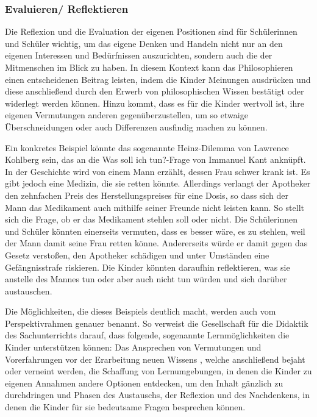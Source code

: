 \subsubsection{Evaluieren/ Reflektieren}


Die Reflexion und die Evaluation der eigenen Positionen sind für Schülerinnen und Schüler wichtig, um das eigene Denken und Handeln nicht nur an den eigenen Interessen und Bedürfnissen auszurichten, sondern auch die der Mitmenschen im Blick zu haben. 
In diesem Kontext kann das Philosophieren einen entscheidenen Beitrag leisten, indem die Kinder Meinungen ausdrücken und diese anschließend durch den Erwerb von philosophischen Wissen bestätigt oder widerlegt werden können. 
Hinzu kommt, dass es für die Kinder wertvoll ist, ihre eigenen Vermutungen anderen gegenüberzustellen, um so etwaige Überschneidungen oder auch Differenzen ausfindig machen zu können. 

Ein konkretes Beispiel könnte das sogenannte \glqq Heinz-Dilemma\grqq{} von Lawrence Kohlberg sein, das an die \glqq Was soll ich tun?\grqq{}-Frage von Immanuel Kant anknüpft. 
In der Geschichte wird von einem Mann erzählt, dessen Frau schwer krank ist. 
Es gibt jedoch eine Medizin, die sie retten könnte.
 Allerdings verlangt der Apotheker den zehnfachen Preis des Herstellungspreises für eine Dosis, so dass sich der Mann das Medikament auch mithilfe seiner Freunde nicht leisten kann. 
 So stellt sich die Frage, ob er das Medikament stehlen soll oder nicht. 
 Die Schülerinnen und Schüler könnten einerseits vermuten, dass es besser wäre, es zu stehlen, weil der Mann damit seine Frau retten könne.
 Andererseits würde er damit gegen das Gesetz verstoßen, den Apotheker schädigen und unter Umständen eine Gefängnisstrafe riskieren. 
 Die Kinder könnten daraufhin reflektieren, was sie anstelle des Mannes tun oder aber auch nicht tun würden und sich darüber austauschen.

Die Möglichkeiten, die dieses Beispiels deutlich macht, werden auch vom Perspektivrahmen genauer benannt.
So verweist die Gesellschaft für die Didaktik des Sachunterrichts darauf, dass folgende, sogenannte \glqq Lernmöglichkeiten\grqq{} die Kinder unterstützen können:
Das Ansprechen von \glqq Vermutungen und Vorerfahrungen vor der Erarbeitung neuen Wissens\grqq{} \cite[S.\,23]{GDS13}, welche anschließend bejaht oder verneint werden, die Schaffung von Lernumgebungen, in denen die Kinder zu eigenen Annahmen andere Optionen entdecken, um den Inhalt gänzlich zu durchdringen und Phasen des Austauschs, der Reflexion und des Nachdenkens, in denen die Kinder für sie bedeutsame Fragen besprechen können.

